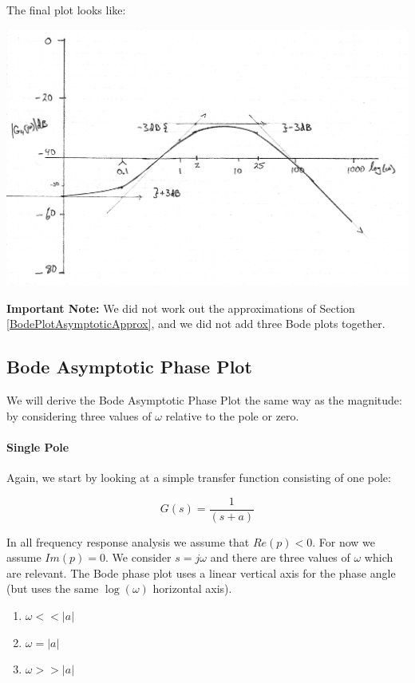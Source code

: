 \begin{ExampleCont}
The final plot looks like:

\includegraphics[width=6.5in]{figs05/00739a.png}


{\bf Important Note: }  We did not work out the approximations of Section \ref{BodePlotAsymptoticApprox}, 
and we did not add three Bode plots together. 


\end{ExampleCont}




\subsection{Bode Asymptotic Phase Plot}

We will derive the Bode Asymptotic Phase Plot the same way as the magnitude: by considering three values of $\omega$ relative to the pole or zero.

\paragraph{Single Pole}

Again, we start by looking at a simple transfer function consisting of one pole:

\[
G(s) = \frac{1}{(s+a)}
\]

In all frequency response analysis we assume that $Re(p) < 0$.  For now we assume $Im(p) = 0$.
We consider $s=j\omega$ and there are three values of $\omega$ which are relevant.
The Bode phase  plot uses a linear vertical axis for the phase angle (but uses the same $\log(\omega)$ horizontal axis).

\begin{enumerate}
  \item  $\omega << |a|$
  \item  $\omega = |a|$
  \item  $\omega >> |a|$
\end{enumerate}

